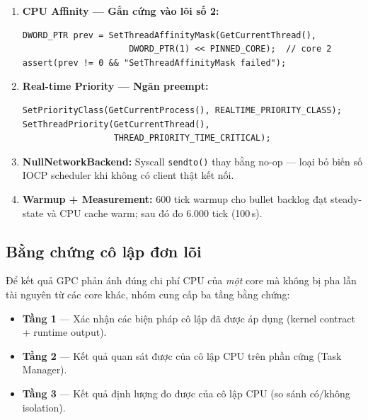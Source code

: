 \documentclass[12pt,a4paper]{report}
\begin{document}
\begin{enumerate}
  \item \textbf{CPU Affinity --- Gắn cứng vào lõi số 2:}
\begin{lstlisting}[style=cppStyle,
  caption={Gắn benchmark thread vào core vật lý số 2},
  label={lst:affinity}]
DWORD_PTR prev = SetThreadAffinityMask(GetCurrentThread(),
                     DWORD_PTR(1) << PINNED_CORE);  // core 2
assert(prev != 0 && "SetThreadAffinityMask failed");
\end{lstlisting}

  \item \textbf{Real-time Priority --- Ngăn preempt:}
\begin{lstlisting}[style=cppStyle,
  caption={Đặt độ ưu tiên real-time để ngăn preempt bởi tác vụ khác},
  label={lst:priority}]
SetPriorityClass(GetCurrentProcess(), REALTIME_PRIORITY_CLASS);
SetThreadPriority(GetCurrentThread(),
                  THREAD_PRIORITY_TIME_CRITICAL);
\end{lstlisting}

  \item \textbf{NullNetworkBackend:} Syscall \texttt{sendto()} thay bằng no-op ---
        loại bỏ biến số IOCP scheduler khi không có client thật kết nối.

  \item \textbf{Warmup + Measurement:} 600 tick warmup cho bullet backlog đạt
        steady-state và CPU cache warm; sau đó đo 6.000 tick (100\,s).
\end{enumerate}

\subsection{Bằng chứng cô lập đơn lõi}

Để kết quả GPC phản ánh đúng chi phí CPU của \emph{một} core mà không bị pha
lẫn tài nguyên từ các core khác, nhóm cung cấp ba tầng bằng chứng:

\begin{itemize}
  \item \textbf{Tầng 1} --- Xác nhận các biện pháp cô lập đã được áp dụng
        (kernel contract + runtime output).
  \item \textbf{Tầng 2} --- Kết quả quan sát được của cô lập CPU trên phần cứng
        (Task Manager).
  \item \textbf{Tầng 3} --- Kết quả định lượng đo được của cô lập CPU
        (so sánh có/không isolation).
\end{itemize}
\end{document}
